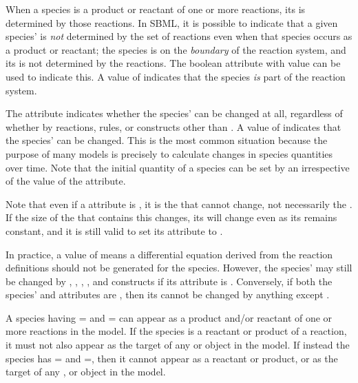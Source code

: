 When a species is a product or reactant of one or more
reactions, its  is determined by those reactions.  In
SBML, it is possible to indicate that a given species'  is
\emph{not} determined by the set of reactions even when that
species occurs as a product or reactant; \ie the species is on the
\emph{boundary} of the reaction system, and its  is not
determined by the reactions.  The boolean attribute
 with value  can be used to indicate 
this.  A value of  indicates that the species
\emph{is} part of the reaction system.

The  attribute indicates whether the species'
 can be changed at all, regardless of whether by
reactions, rules, or constructs other than \InitialAssignment.  A
value of  indicates that the species'  can be
changed.  This is the most common situation because the purpose of
many models is precisely to calculate changes in species
quantities over time.  Note that the initial quantity of a species
can be set by an \InitialAssignment irrespective of the value of
the  attribute.

\begin{blockChanged}
Note that even if a \Species {} attribute is , it
is the  that cannot change, not necessarily the .
If the size of the \Compartment that contains this \Species changes, its
 will change even as its  remains constant,
and it is still valid to set its  attribute to
.
\end{blockChanged}

In practice, a  value of  means
a differential equation derived from the reaction definitions
should not be generated for the species.  However, the species'
 may still be changed by \AssignmentRule, \RateRule,
\AlgebraicRule, \Event, and \InitialAssignment constructs if its
 attribute is .  Conversely, if both
the species'  and 
attributes are , then its  cannot be changed by
anything except \InitialAssignment.

A species having = and
= can appear as a product and/or
reactant of one or more reactions in the model.  If the species is
a reactant or product of a reaction, it must not also appear as
the target of any \AssignmentRule or \RateRule object in the
model.  If instead the species has
= and
=, then it cannot appear as a reactant
or product, or as the target of any \AssignmentRule, \RateRule or
\EventAssignment object in the model.

